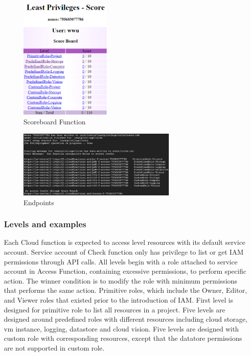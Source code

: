 \documentclass[sigconf]{acmart}
\begin{document}
\begin{figure}[h]
  \centering
  \includegraphics[width=0.4\textwidth]{score}
  \caption {Scoreboard Function}
  \label{fig:score}
\end{figure}

\begin{figure}[h]
  \centering
  \includegraphics[width=0.7\textwidth]{endpoints}
  \caption {Endpoints}
   \label{fig:endpoints}
\end{figure}
\subsubsection{Levels and examples}
Each Cloud function is expected to access level resources with its default service account. Service account of Check function only has privilege to list or get IAM permissions through API calls. All levels begin with a role attached to service account in Access Function,  containing excessive permissions,  to perform specific action. The winner condition is to modify the role with minimum permissions that performs the same action. 
Primitive roles, which include the Owner, Editor, and Viewer roles that existed prior to the introduction of IAM.
First level is designed for primitive role to list all resources in a project. Five levels are designed around predefined roles with different resources including cloud storage, vm instance, logging, datastore and cloud vision. Five levels are designed with custom role with corresponding resources, except that the datatore permissions are not supported in custom role.
\end{document}
